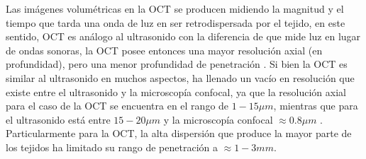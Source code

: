 

Las imágenes volumétricas en la OCT se producen midiendo la magnitud y el tiempo que tarda una onda de luz en ser retrodispersada por el tejido, en este sentido, OCT es análogo al ultrasonido con la diferencia de que mide luz en lugar de ondas sonoras, la  OCT posee entonces una mayor resolución axial (en profundidad), pero una menor profundidad de penetración \cite{Huang1991}. Si bien la OCT es similar al ultrasonido en muchos aspectos, ha llenado un vacío en resolución que existe entre el ultrasonido y la microscopía confocal, ya que la resolución axial para el caso de la OCT se encuentra en el rango de $1-15\mu m$, mientras que para el ultrasonido está entre $15-20\mu m$ y la microscopía confocal $\approx 0.8\mu m$ \cite{Drexler2015}. Particularmente para la OCT, la alta dispersión que produce la mayor parte de los tejidos ha limitado su rango de penetración a $\approx 1-3mm$.

